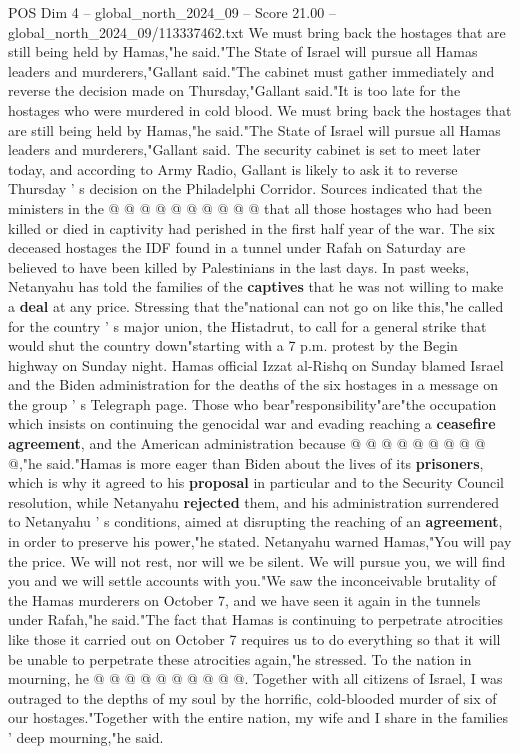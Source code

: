 \begin{textsample}{POS Dim 4 – global\_north\_2024\_09 – Score 21.00 – global\_north\_2024\_09/113337462.txt}
We must bring back the hostages that are still being held by Hamas,"he said."The State of Israel will pursue all Hamas leaders and murderers,"Gallant said."The cabinet must gather immediately and reverse the decision made on Thursday,"Gallant said."It is too late for the hostages who were murdered in cold blood.
We must bring back the hostages that are still being held by Hamas,"he said."The State of Israel will pursue all Hamas leaders and murderers,"Gallant said.
The security cabinet is set to meet later today, and according to Army Radio, Gallant is likely to ask it to reverse Thursday ' s decision on the Philadelphi Corridor.
Sources indicated that the ministers in the @ @ @ @ @ @ @ @ @ @ that all those hostages who had been killed or died in captivity had perished in the first half year of the war.
The six deceased hostages the IDF found in a tunnel under Rafah on Saturday are believed to have been killed by Palestinians in the last days.
In past weeks, Netanyahu has told the families of the \textbf{captives} that he was not willing to make a \textbf{deal} at any price.
Stressing that the"national can not go on like this,"he called for the country ' s major union, the Histadrut, to call for a general strike that would shut the country down"starting with a 7 p.m. protest by the Begin highway on Sunday night.
Hamas official Izzat al-Rishq on Sunday blamed Israel and the Biden administration for the deaths of the six hostages in a message on the group ' s Telegraph page.
Those who bear"responsibility"are"the occupation which insists on continuing the genocidal war and evading reaching a \textbf{ceasefire} \textbf{agreement}, and the American administration because @ @ @ @ @ @ @ @ @ @,"he said."Hamas is more eager than Biden about the lives of its \textbf{prisoners}, which is why it agreed to his \textbf{proposal} in particular and to the Security Council resolution, while Netanyahu \textbf{rejected} them, and his administration surrendered to Netanyahu ' s conditions, aimed at disrupting the reaching of an \textbf{agreement}, in order to preserve his power,"he stated.
Netanyahu warned Hamas,"You will pay the price.
We will not rest, nor will we be silent.
We will pursue you, we will find you and we will settle accounts with you."We saw the inconceivable brutality of the Hamas murderers on October 7, and we have seen it again in the tunnels under Rafah,"he said."The fact that Hamas is continuing to perpetrate atrocities like those it carried out on October 7 requires us to do everything so that it will be unable to perpetrate these atrocities again,"he stressed.
To the nation in mourning, he @ @ @ @ @ @ @ @ @ @.
Together with all citizens of Israel, I was outraged to the depths of my soul by the horrific, cold-blooded murder of six of our hostages."Together with the entire nation, my wife and I share in the families ' deep mourning,"he said.

\end{textsample}
